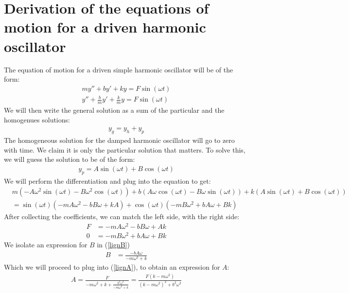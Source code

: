 \documentclass[12pt,oneside,a4paper]{article}
\numberwithin{equation}{section}
\begin{document}
{{{{%
\newpage
\appendix
\section{Derivation of the equations of motion for a driven harmonic oscillator}
The equation of motion for a driven simple harmonic oscillator will be of the form:
\begin{align*}
my'' + by' + ky = F\sin(\omega t)\\
y'' + \frac{b}{m}y' + \frac{k}{m} y = F \sin(\omega t)
\end{align*}
We will then write the general solution as a sum of the particular and the homogenues solutions:
\begin{align*}
y_g = y_{h} + y_p
\end{align*}
The homogeneous solution for the damped harmonic oscillator will go to zero with time. We claim it is only the particular solution that matters. To solve this, we will guess the solution to be of the form:
\begin{align*}
y_p = A \sin (\omega t) + B \cos(\omega t)
\end{align*}
We will perform the differentiation and plug into the equation to get:
\begin{align*}
&m\left(-A\omega^2\sin(\omega t) - B\omega^2\cos(\omega t)\right) + b\left(A\omega\cos(\omega t) - B\omega\sin(\omega t)\right) + k\left( A\sin(\omega t) + B\cos(\omega t) \right)\\
&=\sin(\omega t) \left( -mA\omega^2 -bB\omega + kA \right) + \cos(\omega t)\left(-mB\omega^2 + bA\omega + Bk\right)
\end{align*}
After collecting the coefficients, we can match the left side, with the right side:
\begin{align}
F &= -mA\omega^2 -bB\omega + Ak \label{lignA} \\ 
0 &= -mB\omega^2 + bA\omega + Bk \label{lignB}
\end{align}
We isolate an expression for $B$ in (\ref{lignB})
\begin{align*}
B &= \frac{-bA\omega}{-m\omega^2+k}
\end{align*}
Which we will proceed to plug into (\ref{lignA}), to obtain an expression for $A$:
\begin{align*}
A = \frac{F}{-m\omega^2+k+\frac{b^2\omega^2}{-m\omega^2+k}} = \frac{F\left(k-m\omega^2\right)}{\left(k-m\omega^2\right)^2+b^2\omega^2}
\end{align*} 
}}}}
\end{document}
